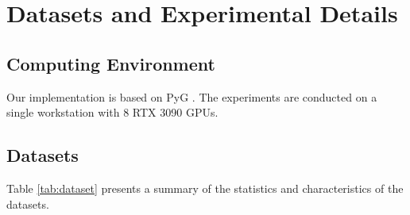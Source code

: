 \section{Datasets and Experimental Details}\label{ap-a}

\subsection{Computing Environment} Our implementation is based on PyG \cite{fey2019fast}. The experiments are conducted on a single workstation with 8 RTX 3090 GPUs.

\subsection{Datasets}\label{ap-a2} Table \ref{tab:dataset} presents a summary of the statistics and characteristics of the datasets.

